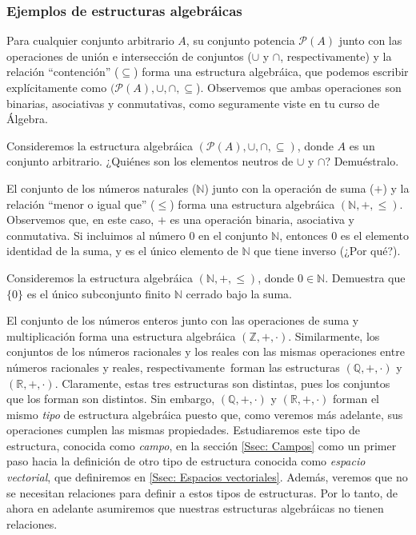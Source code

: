 \documentclass[apuntes]{subfiles}
\begin{document}
\subsubsection*{Ejemplos de estructuras algebráicas} \label{Sssec: Ejemplos de estructuras algebráicas}

Para cualquier conjunto arbitrario $A$, su conjunto potencia $\mathscr{P}(A)$ junto con las operaciones de unión e intersección de conjuntos ($\cup$ y $\cap$, respectivamente) y la relación ``contención'' ($\subseteq$) forma una estructura algebráica, que podemos escribir explícitamente como $(\mathscr{P}(A),\cup,\cap,\subseteq$). Observemos que ambas operaciones son binarias, asociativas y conmutativas, como seguramente viste en tu curso de Álgebra.

\begin{ejer}\label{ejercicio-1}
    Consideremos la estructura algebráica $(\mathscr{P}(A),\cup,\cap,\subseteq)$, donde $A$ es un conjunto arbitrario. ¿Quiénes son los elementos neutros de $\cup$ y $\cap$? Demuéstralo.
\end{ejer}

El conjunto de los números naturales ($\mathbb{N}$) junto con la operación de suma ($+$) y la relación ``menor o igual que'' ($\le$) forma una estructura algebráica $(\mathbb{N},+,\le)$. Observemos que, en este caso, $+$ es una operación binaria, asociativa y conmutativa. Si incluimos al número $0$ en el conjunto $\mathbb{N}$, entonces $0$ es el elemento identidad de la suma, y es el único elemento de $\mathbb{N}$ que tiene inverso (¿Por qué?).

\begin{ejer}\label{ejercicio-2}
    Consideremos la estructura algebráica $(\mathbb{N},+,\le)$, donde $0\in\mathbb{N}$. Demuestra que $\{0\}$ es el único subconjunto finito $\mathbb{N}$ cerrado bajo la suma.
\end{ejer}

El conjunto de los números enteros junto con las operaciones de suma y multiplicación forma una estructura algebráica $(\mathbb{Z},+,\cdot)$. Similarmente, los conjuntos de los números racionales y los reales con las mismas operaciones \textemdash entre números racionales y reales, respectivamente\textemdash \ forman las estructuras $(\mathbb{Q},+,\cdot)$ y $(\mathbb{R},+,\cdot)$. Claramente, estas tres estructuras son distintas, pues los conjuntos que los forman son distintos. Sin embargo, $(\mathbb{Q},+,\cdot)$ y $(\mathbb{R},+,\cdot)$ forman el mismo \emph{tipo} de estructura algebráica puesto que, como veremos más adelante, sus operaciones cumplen las mismas propiedades. Estudiaremos este tipo de estructura, conocida como \emph{campo}, en la sección \ref{Ssec: Campos} como un primer paso hacia la definición de otro tipo de estructura conocida como \emph{espacio vectorial}, que definiremos en \ref{Ssec: Espacios vectoriales}. Además, veremos que no se necesitan relaciones para definir a estos tipos de estructuras. Por lo tanto, de ahora en adelante asumiremos que nuestras estructuras algebráicas no tienen relaciones. \\
\end{document}
